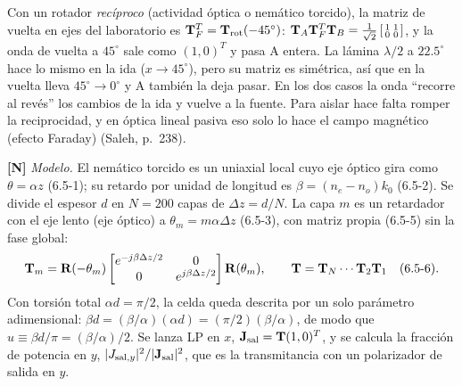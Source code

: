  Con un rotador \emph{recíproco} (actividad óptica o nemático torcido), la matriz de vuelta en ejes del
laboratorio es $\mathbf T_F^T=\mathbf T_{\rm rot}(-45^\circ)$:
$\mathbf T_A\mathbf T_F^T\mathbf T_B=\frac{1}{\sqrt2}\left[\begin{smallmatrix}1&1\\0&0\end{smallmatrix}\right]$, y la onda de vuelta a
$45^\circ$ sale como $(1,0)^T$ y pasa A entera. La lámina $\lambda/2$ a $22.5^\circ$ hace lo mismo en la ida
($x\to45^\circ$), pero su matriz es simétrica, así que en la vuelta lleva $45^\circ\to0^\circ$ y A también la
deja pasar. En los dos casos la onda ``recorre al revés'' los cambios de la ida y vuelve a la fuente. Para aislar
hace falta romper la reciprocidad, y en óptica lineal pasiva eso solo lo hace el campo magnético
(efecto Faraday) (Saleh, p.~238).


\label{sol:27}

\textbf{[N]} \emph{Modelo.} El nemático torcido es un uniaxial local cuyo eje óptico gira como
$\theta=\alpha z$ (6.5-1); su retardo por unidad de longitud es $\beta=(n_e-n_o)k_0$ (6.5-2). Se divide el
espesor $d$ en $N=200$ capas de $\Delta z=d/N$. La capa $m$ es un retardador con el eje lento (eje óptico) a
$\theta_m=m\alpha\Delta z$ (6.5-3), con matriz propia (6.5-5) sin la fase global:
\[
\mathbf T_m=\mathbf R(-\theta_m)\begin{bmatrix}e^{-j\beta\Delta z/2}&0\\0&e^{j\beta\Delta z/2}\end{bmatrix}\mathbf R(\theta_m),\qquad
\mathbf T=\mathbf T_N\cdots\mathbf T_2\mathbf T_1\quad(6.5\text{-}6).
\]
Con torsión total $\alpha d=\pi/2$, la celda queda descrita por un solo parámetro adimensional:
$\beta d=(\beta/\alpha)(\alpha d)=(\pi/2)(\beta/\alpha)$, de modo que $u\equiv\beta d/\pi=(\beta/\alpha)/2$. Se
lanza LP en $x$, $\mathbf J_{\rm sal}=\mathbf T(1,0)^T$, y se calcula la fracción de potencia en $y$,
$|J_{{\rm sal},y}|^2/|\mathbf J_{\rm sal}|^2$, que es la transmitancia con un polarizador de salida en $y$.

